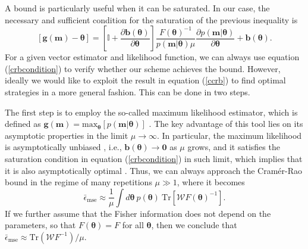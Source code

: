 A bound is particularly useful when it can be saturated. In our case, the necessary and sufficient condition for the saturation of the previous inequality is \cite{kay1993, jaynes2003}
\begin{equation}
\left[ \boldsymbol{g}(\boldsymbol{m}) - \boldsymbol{\theta} \right] =  \left[\mathbb{I} + \frac{\partial \boldsymbol{b}(\boldsymbol{\theta})}{\partial \boldsymbol{\theta}} \right] \frac{F(\boldsymbol{\theta})^{-1}}{p(\boldsymbol{m}|\boldsymbol{\theta})\mu}  \frac{\partial p(\boldsymbol{m}|\boldsymbol{\theta})}{\partial \boldsymbol{\theta}} + \boldsymbol{b}(\boldsymbol{\theta}).
\label{crbcondition}
\end{equation}
For a given vector estimator and likelihood function, we can always use equation (\ref{crbcondition}) to verify whether our scheme achieves the bound. However, ideally we would like to exploit the result in equation (\ref{ccrb}) to find optimal strategies in a more general fashion. This can be done in two steps. 

The first step is to employ the so-called maximum likelihood estimator, which is defined as $\boldsymbol{g}(\boldsymbol{m}) = \mathrm{max}_{\boldsymbol{\theta}}\left[ p(\boldsymbol{m}| \boldsymbol{\theta}) \right]$ \cite{rafal2015, kay1993}. The key advantage of this tool lies on its asymptotic properties in the limit $\mu \rightarrow \infty$. In particular, the maximum likelihood is asymptotically unbiased \cite{rafal2015, kay1993}, i.e., $\boldsymbol{b}(\boldsymbol{\theta}) \rightarrow \boldsymbol{0}$ as $\mu$ grows, and it satisfies the saturation condition in equation (\ref{crbcondition}) in such limit, which implies that it is also asymptotically optimal \cite{kay1993, vaart1998}. Thus, we can always approach the Cram\'{e}r-Rao bound in the regime of many repetitions $\mu \gg 1$, where it becomes
\begin{equation}
\bar{\epsilon}_{\mathrm{mse}} \approx \frac{1}{\mu}\int d\boldsymbol{\theta}~p(\boldsymbol{\theta}) ~\mathrm{Tr}\left[\mathcal{W} F(\boldsymbol{\theta})^{-1}\right].
\label{ccrbmulti}
\end{equation} 
If we further assume that the Fisher information does not depend on the parameters, so that $F(\boldsymbol{\theta})=F$ for all $\boldsymbol{\theta}$, then we conclude that $\bar{\epsilon}_{\mathrm{mse}} \approx \mathrm{Tr}(\mathcal{W} F^{-1})/\mu$.

